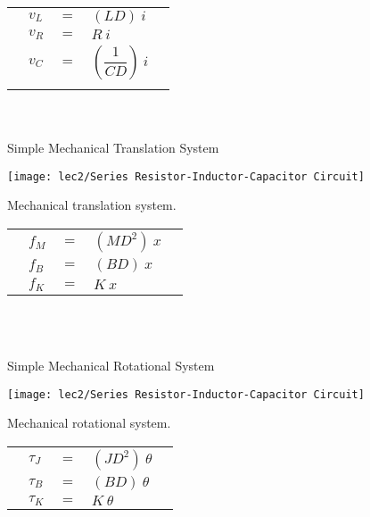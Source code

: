 \begin{tabular}{C{1mm} C{1mm} C{2cm} l l}
			&$v_L$& $=$ & $(LD)\ i$ &\\
			&$v_R$& $=$ & $R\ i$	&\\
			&$v_C$& $=$ & $(\dfrac{1}{CD})\ i$&\\
			&&&&
\end{tabular}

\vspace{-4em}
\hspace*{\fill}\\[+2mm]
\\[-1em]


Simple Mechanical Translation System\\[-1mm]
\begin{marginfigure}[-1em]
		\texttt{[image: lec2/Series Resistor-Inductor-Capacitor Circuit]}
		\caption{Mechanical translation system.}
\end{marginfigure}

\begin{tabular}{C{1mm} C{1mm} C{2cm} l l}
			&$f_M$& $=$ & $(MD^2)\ x$ &\\
			&$f_B$& $=$ & $(BD)\ x$	&\\
			&$f_K$& $=$ & $K\ x$&\\
\end{tabular}

\vspace{-1em}
\hspace*{\fill}\\[+2mm]
\\

\pagebreak

Simple Mechanical Rotational System\\[-1mm]
\begin{marginfigure}[-1em]
		\texttt{[image: lec2/Series Resistor-Inductor-Capacitor Circuit]}
		\caption{Mechanical rotational system.}
\end{marginfigure}

\begin{tabular}{C{1mm} C{1mm} C{2cm} l l}
			&$\tau_J$& $=$ & $(JD^2)\ \theta$ &\\
			&$\tau_B$& $=$ & $(BD)\ \theta$	&\\
			&$\tau_K$& $=$ & $K\ \theta$&\\
\end{tabular}


